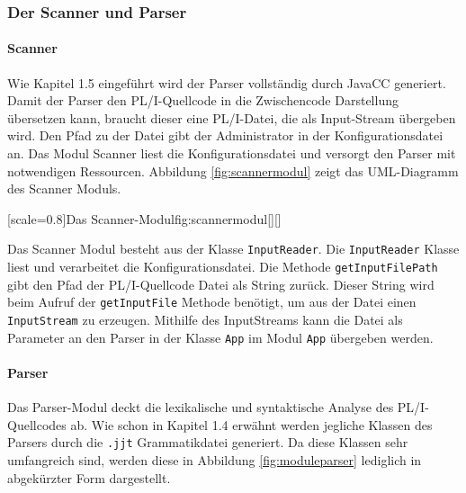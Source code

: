 \subsubsection{Der Scanner und Parser}
\paragraph{Scanner}
Wie Kapitel 1.5 eingeführt wird der Parser vollständig durch 
JavaCC generiert.
Damit der Parser den PL/I-Quellcode in die Zwischencode Darstellung übersetzen kann,
braucht dieser eine PL/I-Datei, die als Input-Stream übergeben wird.
Den Pfad zu der Datei gibt der Administrator in der Konfigurationsdatei an.
Das Modul Scanner liest die Konfigurationsdatei und versorgt den Parser mit notwendigen Ressourcen.
Abbildung \ref{fig:scannermodul} zeigt das UML-Diagramm des Scanner Moduls.

[scale=0.8]{Das Scanner-Modul}{fig:scannermodul}[][]

Das Scanner Modul besteht aus der Klasse \verb+InputReader+. 
Die \verb+InputReader+ Klasse liest und verarbeitet die Konfigurationsdatei. Die Methode \verb+getInputFilePath+ gibt den Pfad der PL/I-Quellcode Datei als String zurück.
Dieser String wird beim Aufruf der \verb+getInputFile+ Methode benötigt, um aus der Datei einen \verb+InputStream+ zu erzeugen.
Mithilfe des InputStreams kann die Datei als Parameter an den Parser in der Klasse \verb+App+ im Modul \verb+App+
übergeben werden. 


\paragraph{Parser}
Das Parser-Modul deckt die lexikalische und syntaktische Analyse des PL/I-Quellcodes ab.
Wie schon in Kapitel 1.4 erwähnt werden jegliche Klassen des Parsers durch die \verb+.jjt+ Grammatikdatei generiert. Da diese Klassen sehr umfangreich sind, werden diese in Abbildung \ref{fig:moduleparser} lediglich in abgekürzter Form dargestellt. 


